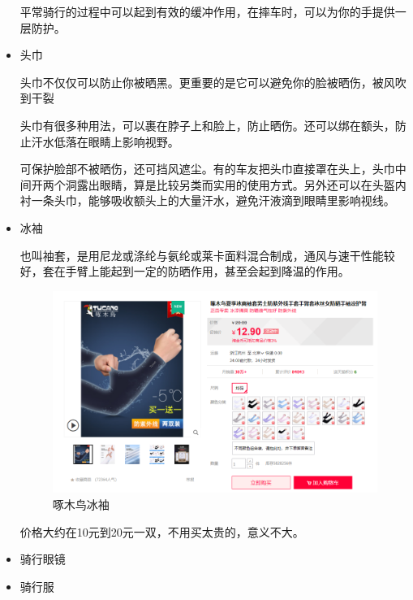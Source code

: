 \documentclass{ctexbook}
\begin{document}
\begin{itemize}
        平常骑行的过程中可以起到有效的缓冲作用，在摔车时，可以为你的手提供一层防护。
    

        \item 头巾  
        
        头巾不仅仅可以防止你被晒黑。更重要的是它可以避免你的脸被晒伤，被风吹到干裂
    
        头巾有很多种用法，可以裹在脖子上和脸上，防止晒伤。还可以绑在额头，防止汗水低落在眼睛上影响视野。
    
        可保护脸部不被晒伤，还可挡风遮尘。有的车友把头巾直接罩在头上，头巾中间开两个洞露出眼睛，算是比较另类而实用的使用方式。另外还可以在头盔内衬一条头巾，能够吸收额头上的大量汗水，避免汗液滴到眼睛里影响视线。

        \item 冰袖
    
        也叫袖套，是用尼龙或涤纶与氨纶或莱卡面料混合制成，通风与速干性能较好，套在手臂上能起到一定的防晒作用，甚至会起到降温的作用。

        \begin{figure}[H]
            \caption{啄木鸟冰袖}
            \begin{center}
            \includegraphics[scale=0.3]{fig/啄木鸟冰袖.png}
            \end{center}
        \end{figure}

        价格大约在10元到20元一双，不用买太贵的，意义不大。
        \item 骑行眼镜
        \item 骑行服

    \end{itemize}
    
\end{document}
